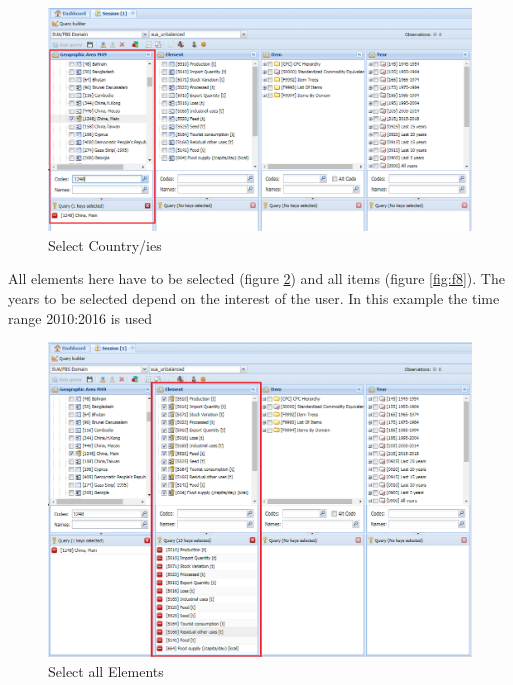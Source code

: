 \documentclass[]{article}
\begin{document}
\begin{figure}[H]

{\centering \includegraphics[width=1\linewidth]{images/standPlugin/06_selectCountry} 

}

\caption{\label{fig:f6}Select Country/ies}\label{fig:f6}
\end{figure}

All elements here have to be selected (figure \ref{fig:f7}) and all
items (figure \ref{fig:f8}). The years to be selected depend on the
interest of the user. In this example the time range 2010:2016 is used

\begin{figure}[H]

{\centering \includegraphics[width=1\linewidth]{images/standPlugin/07_selectElement} 

}

\caption{\label{fig:f7}Select all Elements}\label{fig:f7}
\end{figure}
\end{document}
